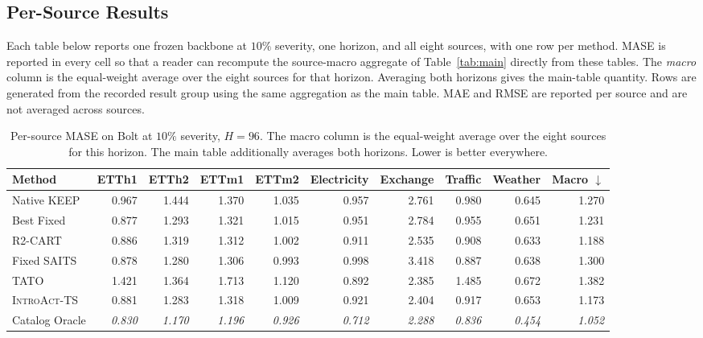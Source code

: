 \documentclass{article}
\newcommand{\oracle}[1]{\textit{\textcolor{phgray}{#1}}}
\newcommand{\introact}{\textsc{IntroAct-TS}}
\begin{document}
\subsection{Per-Source Results}
\label{app:datasets}
Each table below reports one frozen backbone at $10\%$ severity, one horizon, and
all eight sources, with one row per method. MASE is reported in every cell so that a
reader can recompute the source-macro aggregate of Table~\ref{tab:main} directly from
these tables. The \emph{macro} column is the equal-weight average over the eight sources
for that horizon. Averaging both horizons gives the main-table quantity. Rows are generated from the recorded result
group using the same aggregation as the main table.
MAE and RMSE are reported per source and are not averaged across sources.

\begin{table}[htbp]
  \caption{Per-source MASE on Bolt at $10\%$ severity, $H=96$. The macro column is the
  equal-weight average over the eight sources for this horizon. The main table additionally averages both horizons. Lower is better everywhere.}
  \label{tab:app-src-bolt-96}
  \centering
  \small
  \setlength{\tabcolsep}{3pt}
\begin{tabular*}{\textwidth}{@{\extracolsep{\fill}}lrrrrrrrrr@{}}
    \toprule
    Method & ETTh1 & ETTh2 & ETTm1 & ETTm2 & Electricity & Exchange & Traffic & Weather & Macro $\downarrow$ \\
    \midrule
    Native KEEP & 0.967 & 1.444 & 1.370 & 1.035 & 0.957 & 2.761 & 0.980 & 0.645 & 1.270 \\
    Best Fixed & 0.877 & 1.293 & 1.321 & 1.015 & 0.951 & 2.784 & 0.955 & 0.651 & 1.231 \\
    R2-CART & 0.886 & 1.319 & 1.312 & 1.002 & 0.911 & 2.535 & 0.908 & 0.633 & 1.188 \\
    Fixed SAITS & 0.878 & 1.280 & 1.306 & 0.993 & 0.998 & 3.418 & 0.887 & 0.638 & 1.300 \\
    TATO & 1.421 & 1.364 & 1.713 & 1.120 & 0.892 & 2.385 & 1.485 & 0.672 & 1.382 \\
    \midrule
    \rowcolor{bestgray}\introact{} & 0.881 & 1.283 & 1.318 & 1.009 & 0.921 & 2.404 & 0.917 & 0.653 & 1.173 \\
    \midrule
    Catalog Oracle & \oracle{0.830} & \oracle{1.170} & \oracle{1.196} & \oracle{0.926} & \oracle{0.712} & \oracle{2.288} & \oracle{0.836} & \oracle{0.454} & \oracle{1.052} \\
    \bottomrule
  \end{tabular*}
\end{table}
\end{document}
